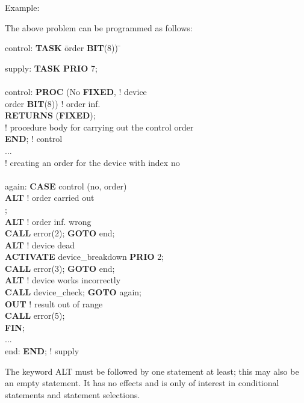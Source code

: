 Example:

The above problem can be programmed as follows:

\begin{tabbing}

control: \= {\bf TASK} \= order {\bf BIT}(8)) \x \= \kill

supply:  \> {\bf TASK} \> {\bf PRIO} 7;       \> \\
 \> \> \> \\
control: \> {\bf PROC} \> (No {\bf FIXED},    \> ! device \\
 \>             \> order {\bf BIT}(8)) \> ! order inf.\\
 \> {\bf RETURNS} ({\bf FIXED});   \>  \> \\
 \> ! procedure body for carrying out the control order \> \> \\
 \> {\bf END}; ! control \> \> \\
 \> ... \> \> \\
 \> ! creating an order for the device with index no \> \> \\
 \> \> \> \\
again:   \> {\bf CASE} \> control (no, order) \> \\
 \> {\bf ALT}   \> ! order carried out \> \\
 \>             \> ; \> \\
 \> {\bf ALT}   \> ! order inf. wrong \> \\
 \>             \> {\bf CALL} error(2); {\bf GOTO} end; \> \\
 \> {\bf ALT}   \> ! device dead \> \\
 \>             \> {\bf ACTIVATE} device\_breakdown {\bf PRIO} 2; \> \\
 \>             \> {\bf CALL} error(3); {\bf GOTO} end; \> \\
 \> {\bf ALT}   \> ! device works incorrectly \> \\
 \>             \> {\bf CALL} device\_check; {\bf GOTO} again; \> \\
 \> {\bf OUT}   \> ! result out of range \> \\
 \>             \> {\bf CALL} error(5); \> \\
 \> {\bf FIN}; \> \> \\
 \> ...         \> \> \\
end:     \> {\bf END}; \> ! supply \>
\end{tabbing}

The keyword ALT must be followed by
one statement at least; this may also be an empty statement. It has no
effects and is only of interest in conditional statements and statement
selections.

